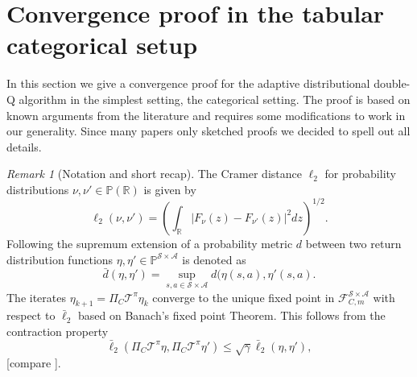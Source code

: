 \documentclass{article}
\newcommand{\cA}{\mathcal{A}}
\newcommand{\cF}{\mathcal{F}}
\newcommand{\cP}{\mathbb{P}}
\newcommand{\cS}{\mathcal{S}}
\newcommand{\cT}{\mathcal{T}}
\newcommand{\R}{\mathbb{R}}
\theoremstyle{plain}
\theoremstyle{definition}
\theoremstyle{remark}
\newtheorem{remark}[theorem]{Remark}
\begin{document}
\newpage 
\quad
\newpage






\section{Convergence proof in the tabular categorical setup}\label{sec:proof}
In this section we give a convergence proof for the adaptive distributional double-Q algorithm in the simplest setting, the categorical setting. The proof is based on known arguments from the literature and requires some modifications to work in our generality. Since many papers only sketched proofs we decided to spell out all details.
\begin{remark}[Notation and short recap]
The Cramer distance $\ell_2$ for probability distributions $\nu,\nu'\in\cP(\R)$ is given by
\[\ell_2(\nu, \nu') = \left( \int_{\mathbb{R}} \left| F_{\nu}(z) - F_{\nu'}(z) \right|^2 dz \right)^{1/2}.\]
Following \cite{rowland18,drl} the supremum extension of a probability metric $d$ between two return distribution functions $\eta,\eta'\in\cP^{\cS\times\cA}$ is denoted as
\[\bar d(\eta,\eta')=\sup_{s,a\in\cS\times\cA}d(\eta(s,a),\eta'(s,a).\]
The iterates $\eta_{k+1}=\Pi_C\cT^\pi\eta_k$ converge to the unique fixed point in $\cF_{C,m}^{\cS\times\cA}$ with respect to $\bar\ell_2$ based on Banach's fixed point Theorem. This follows from the contraction property
\begin{equation}
\bar\ell_2(\Pi_C\cT^\pi\eta,\Pi_C\cT^\pi\eta')\leq\sqrt{\gamma}\bar\ell_2(\eta,\eta'),
\end{equation}
[compare \cite{rowland18,drl}].
\end{remark}
\end{document}
